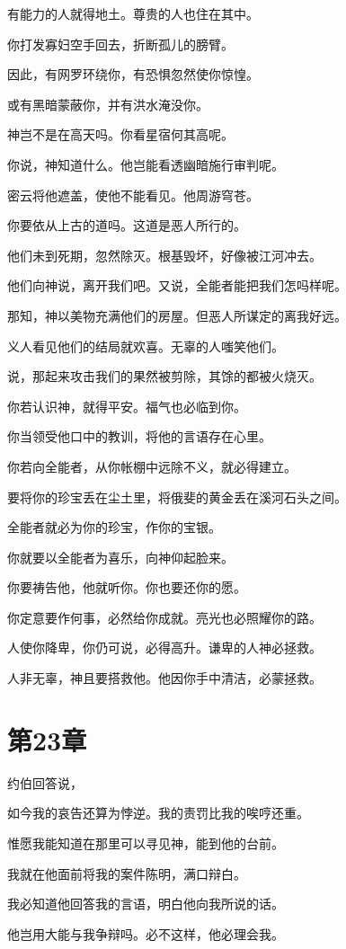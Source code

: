 \documentclass[12pt,oneside]{book}
\begin{document}
有能力的人就得地土。尊贵的人也住在其中。

你打发寡妇空手回去，折断孤儿的膀臂。

因此，有网罗环绕你，有恐惧忽然使你惊惶。

或有黑暗蒙蔽你，并有洪水淹没你。

神岂不是在高天吗。你看星宿何其高呢。

你说，神知道什么。他岂能看透幽暗施行审判呢。

密云将他遮盖，使他不能看见。他周游穹苍。

你要依从上古的道吗。这道是恶人所行的。

他们未到死期，忽然除灭。根基毁坏，好像被江河冲去。

他们向神说，离开我们吧。又说，全能者能把我们怎吗样呢。

那知，神以美物充满他们的房屋。但恶人所谋定的离我好远。

义人看见他们的结局就欢喜。无辜的人嗤笑他们。

说，那起来攻击我们的果然被剪除，其馀的都被火烧灭。

你若认识神，就得平安。福气也必临到你。

你当领受他口中的教训，将他的言语存在心里。

你若向全能者，从你帐棚中远除不义，就必得建立。

要将你的珍宝丢在尘土里，将俄斐的黄金丢在溪河石头之间。

全能者就必为你的珍宝，作你的宝银。

你就要以全能者为喜乐，向神仰起脸来。

你要祷告他，他就听你。你也要还你的愿。

你定意要作何事，必然给你成就。亮光也必照耀你的路。

人使你降卑，你仍可说，必得高升。谦卑的人神必拯救。

人非无辜，神且要搭救他。他因你手中清洁，必蒙拯救。


\chapter{第23章}
约伯回答说，

如今我的哀告还算为悖逆。我的责罚比我的唉哼还重。

惟愿我能知道在那里可以寻见神，能到他的台前。

我就在他面前将我的案件陈明，满口辩白。

我必知道他回答我的言语，明白他向我所说的话。

他岂用大能与我争辩吗。必不这样，他必理会我。
\end{document}
